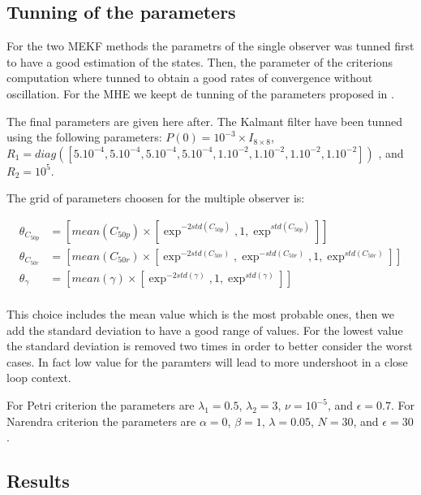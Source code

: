 \subsection{Tunning of the parameters}


For the two MEKF methods the parametrs of the single observer was tunned first to have a good estimation of the states. Then, the parameter of the criterions computation where tunned to obtain a good rates of convergence without oscillation. For the MHE we keept de tunning of the parameters proposed in \cite{moussaDataBasedExtendedMoving2023}. \medskip

The final parameters are given here after. The Kalmant filter have been tunned using the following parameters: $P(0) = 10^{-3} \times I_{8 \times 8}$, $R_1 =  diag([5.10^{-4}, 5.10^{-4},5.10^{-4},5.10^{-4}, 1.10^{-2},  1.10^{-2}, 1.10^{-2}, 1.10^{-2}])$ , and $R_2 =  10^{5}$.\medskip

The grid of parameters choosen for the multiple observer is:

\begin{equation}
    \begin{split}
        \theta_{C_{50p}} &= [mean(C_{50p})\times [\exp^{-2std(C_{50p})}, 1, \exp^{std(C_{50p})}]] \\
        \theta_{C_{50r}} &= [mean(C_{50r})\times[\exp^{-2std(C_{50r})}, \exp^{-std(C_{50r})}, 1, \exp^{std(C_{50r})}]] \\
        \theta_{\gamma} &= [mean(\gamma) \times [\exp^{-2std(\gamma )}, 1, \exp^{std(\gamma )}]] \\
    \end{split}
\end{equation}

This choice includes the mean value which is the most probable ones, then we add the standard deviation to have a good range of values. For the lowest value the standard deviation is removed two times in order to better consider the worst cases. In fact low value for the paramters will lead to more undershoot in a close loop context. \medskip

For Petri criterion the parameters are $\lambda_1 = 0.5$, $\lambda_2 = 3$, $\nu = 10^{-5}$, and $\epsilon = 0.7$. For Narendra criterion the parameters are $\alpha = 0$, $\beta = 1$, $\lambda = 0.05$, $N = 30$, and $\epsilon = 30$.\medskip



\subsection{Results}

